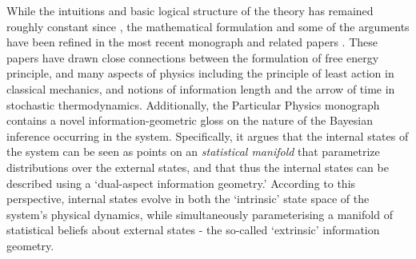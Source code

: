 While the intuitions and basic logical structure of the theory has remained roughly constant since \citet{friston2013life,friston2012free}, the mathematical formulation and some of the arguments have been refined in the most recent \citet{friston2019particularphysics} monograph and related papers \citep{friston2020some,parr2020Markov}. These papers have drawn close connections between the formulation of free energy principle, and many aspects of physics including the principle of least action in classical mechanics, and notions of information length and the arrow of time in stochastic thermodynamics. Additionally, the Particular Physics monograph \citep{friston2019particularphysics} contains a novel information-geometric gloss on the nature of the Bayesian inference occurring in the system. Specifically, it argues that the internal states of the system can be seen as points on an \emph{statistical manifold} that parametrize distributions over the external states, and that thus the internal states can be described using a `dual-aspect information geometry.' According to this perspective, internal states evolve in both the `intrinsic' state space of the system's physical dynamics, while simultaneously parameterising a manifold of statistical beliefs about external states - the so-called `extrinsic' information geometry. 


